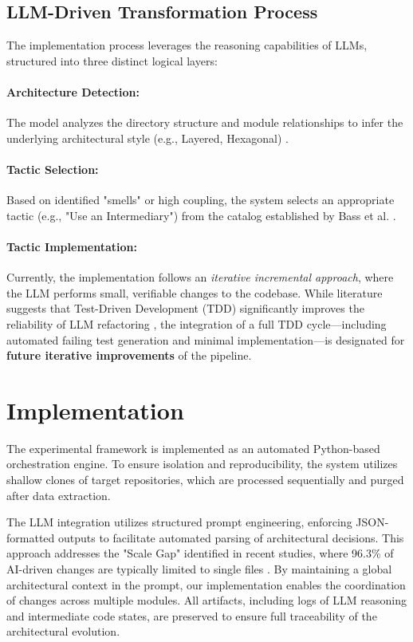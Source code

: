 \documentclass[sigconf,review]{acmart}
\begin{document}
\subsection{LLM-Driven Transformation Process}
The implementation process leverages the reasoning capabilities of LLMs, structured into three distinct logical layers:

\paragraph{Architecture Detection:} The model analyzes the directory structure and module relationships to infer the underlying architectural style (e.g., Layered, Hexagonal) \cite{perry1992foundations, garlan1993introduction}.
\paragraph{Tactic Selection:} Based on identified "smells" or high coupling, the system selects an appropriate tactic (e.g., "Use an Intermediary") from the catalog established by Bass et al. \cite{bass2021software}.
\paragraph{Tactic Implementation:} Currently, the implementation follows an \textit{iterative incremental approach}, where the LLM performs small, verifiable changes to the codebase. While literature suggests that Test-Driven Development (TDD) significantly improves the reliability of LLM refactoring \cite{xu2025mantra, piao2025refactoring}, the integration of a full TDD cycle—including automated failing test generation and minimal implementation—is designated for \textbf{future iterative improvements} of the pipeline.

\section{Implementation}
The experimental framework is implemented as an automated Python-based orchestration engine. To ensure isolation and reproducibility, the system utilizes shallow clones of target repositories, which are processed sequentially and purged after data extraction.

The LLM integration utilizes structured prompt engineering, enforcing JSON-formatted outputs to facilitate automated parsing of architectural decisions. This approach addresses the "Scale Gap" identified in recent studies, where 96.3\% of AI-driven changes are typically limited to single files \cite{piao2025refactoring}. By maintaining a global architectural context in the prompt, our implementation enables the coordination of changes across multiple modules. All artifacts, including logs of LLM reasoning and intermediate code states, are preserved to ensure full traceability of the architectural evolution.
\end{document}
